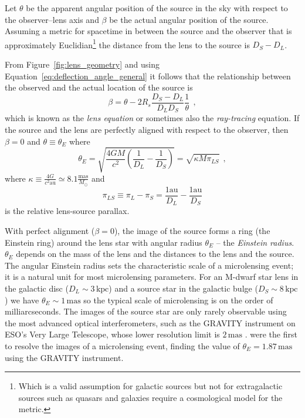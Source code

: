 \documentclass[12pt,dvipsnames]{report}
\newcommand{\hquad}{~~}
\begin{document}
Let $\theta$ be the apparent angular position of the source in the sky with respect to the
observer--lens axis and $\beta$ be the actual angular position of the source.
Assuming a metric for spacetime in between the source and the observer that is
approximately Euclidian\footnote{Which is a valid assumption for galactic sources but not for
    extragalactic sources such as quasars and galaxies require a cosmological
    model for the metric.} the distance from the lens to the
source is $D_S-D_L$.

From Figure~\ref{fig:lens_geometry} and using Equation~\ref{eq:deflection_angle_general} it follows 
that the relationship between
the observed and the actual location of the source is 
\begin{equation}
    \beta=\theta-2 R_s \frac{D_S-D_L}{D_LD_S}
    \frac{1}{\theta}
    \hquad,
    \label{eq:lens_equation}
\end{equation}
which is known as the \emph{lens equation} or sometimes also the \emph{ray-tracing}
equation. If the source and the lens are perfectly aligned with respect to the observer,
then $\beta=0$ and $\theta\equiv\theta_E$ where
\begin{equation}
    \theta_E= \sqrt{ \frac{4GM}{c^2} \left( \frac{1}{D_L} - \frac{1}{D_S} \right)}=
    \sqrt{\kappa M\pi_{LS}}
    \hquad,
    \label{eq:angular_einstein_radius}
\end{equation}
where $\kappa \equiv \frac{4 G}{c^{2} \mathrm{au}} \simeq 8.1 \frac{\mathrm{mas}}{M_{\odot}}$
and
\begin{equation}
    \pi_{LS}\equiv\pi_L - \pi_S=\frac{1\mathrm{au}}{D_L}-\frac{1\mathrm{au}}{D_S}
\end{equation}
is the relative lens-source parallax.

With perfect alignment ($\beta=0$), the image of the source forms a ring (the Einstein ring) around the lens star
with angular radius $\theta_E$ -- the \emph{Einstein radius}. $\theta_E$
depends on the mass of the lens and the distances to the lens and the source.
The angular Einstein radius sets the characteristic scale of a microlensing
event; it is a natural unit for most microlensing parameters. For an M-dwarf
star lens in the galactic disc ($D_L\sim 3\,\textrm{kpc}$) and a source star in
the galactic bulge ($D_S\sim 8\,\textrm{kpc}$) we have $\theta_E\sim
    1\,\textrm{mas}$ so the typical scale of microlensing is on the order of
milliarcseconds. The images of the source star are only rarely observable using
the most advanced optical interferometers, such as the GRAVITY instrument on
ESO's Very Large Telescope, whose lower resolution limit is $2\,\textrm{mas}$
\citep{arXiv:1705.02345}. \citet{2019ApJ...871...70D} were the first to resolve
the images of a microlensing event, finding the value of
$\theta_E=1.87\,\textrm{mas}$ using the GRAVITY instrument.
\end{document}
